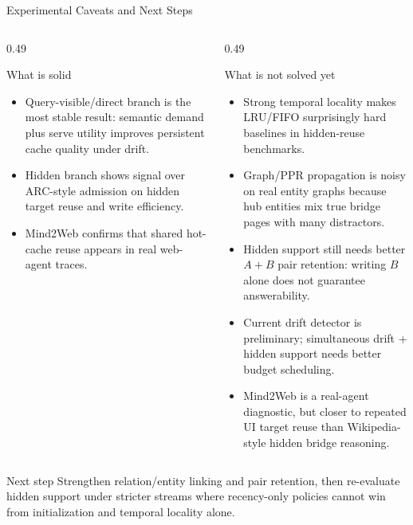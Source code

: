 \documentclass[aspectratio=169,10pt]{beamer}
\newcommand{\en}[1]{{\latinfont #1}}
\newcommand{\arc}{\en{ARC}}
\newcommand{\lru}{\en{LRU}}
\newcommand{\fifo}{\en{FIFO}}
\begin{document}
\begin{frame}{Experimental Caveats and Next Steps}
  \scriptsize
  \begin{columns}[T]
    \begin{column}{0.49\textwidth}
      \begin{block}{What is solid}
        \begin{itemize}
          \setlength\itemsep{0.25em}
          \item Query-visible/direct branch is the most stable result:
          semantic demand plus serve utility improves persistent cache quality
          under drift.
          \item Hidden branch shows signal over \arc{}-style admission on
          hidden target reuse and write efficiency.
          \item Mind2Web confirms that shared hot-cache reuse appears in real
          web-agent traces.
        \end{itemize}
      \end{block}
    \end{column}

    \begin{column}{0.49\textwidth}
      \begin{alertblock}{What is not solved yet}
        \begin{itemize}
          \setlength\itemsep{0.25em}
          \item Strong temporal locality makes \lru{}/\fifo{} surprisingly hard
          baselines in hidden-reuse benchmarks.
          \item Graph/PPR propagation is noisy on real entity graphs because hub
          entities mix true bridge pages with many distractors.
          \item Hidden support still needs better $A+B$ pair retention:
          writing $B$ alone does not guarantee answerability.
          \item Current drift detector is preliminary; simultaneous drift +
          hidden support needs better budget scheduling.
          \item Mind2Web is a real-agent diagnostic, but closer to repeated UI
          target reuse than Wikipedia-style hidden bridge reasoning.
        \end{itemize}
      \end{alertblock}
    \end{column}
  \end{columns}

  \begin{block}{Next step}
    Strengthen relation/entity linking and pair retention, then re-evaluate
    hidden support under stricter streams where recency-only policies cannot
    win from initialization and temporal locality alone.
  \end{block}
\end{frame}
\end{document}
